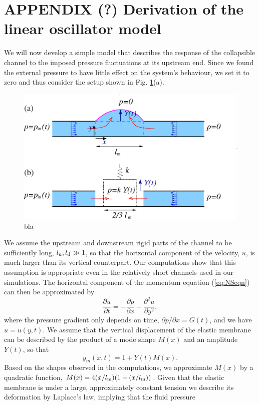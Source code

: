 \documentclass[aps,prl,reprint,superscriptaddress,floatfix]{revtex4-1}
\newcommand{\be}{\begin{equation}}
\newcommand{\ee}{\end{equation}}
\begin{document}
\section{APPENDIX (?) Derivation of the linear oscillator model}
We will now develop a simple model that describes the response
of the collapsible channel to the imposed pressure fluctuations at
its upstream end. Since we found the external pressure to have
little effect on the system's behaviour, we set it to
zero and thus consider the setup shown in Fig. \ref{model.png}(a).
\begin{figure}
\includegraphics[width=0.99\linewidth]{pictures/model.png}
\caption{\label{model.png}bla}
\end{figure}
  We assume the upstream and downstream rigid parts of
the channel to be sufficiently long, $l_{\rm u}, l_{\rm d} \gg 1$, so that the 
horizontal component of the velocity, $u$, is much larger
than its vertical counterpart. Our computations
show that this assumption is appropriate even in the relatively
short channels used in our simulations. The horizontal component of
the momentum equation (\ref{eq:NSeqn}) can then be approximated by 
\be
\label{long_wavelength_momentum}
\frac{\partial u}{\partial t} = -\frac{\partial p}{\partial x} +
\frac{\partial^2 u}{\partial y^2},
\ee
where the pressure gradient only depends on time, 
$\partial p/\partial x = G(t)$, and we have $u=u(y,t)$. We assume that the
vertical displacement of the elastic membrane can be described by the
product of a mode shape $M(x)$ and an amplitude $Y(t)$, so that
\be
y_m(x,t) = 1+ Y(t) M(x).
\ee
Based on the shapes observed in the computations,
we approximate $M(x)$ by a quadratic function,
$M(x) = 4 (x/l_{\rm  m})(1-(x/l_{\rm m}))$. Given that the 
elastic membrane is under a large, approximately constant tension we describe
its deformation by Laplace's law, implying that the fluid pressure
\end{document}
